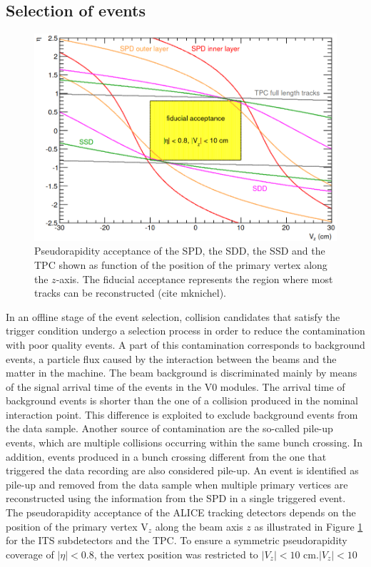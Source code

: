 \documentclass[12pt,a4paper]{report}
\begin{document}
\subsection{Selection of events}
\begin{figure}[tb!]
\centering
\includegraphics[width=12cm]{Plots/fiducialAcc.png}  
\caption{Pseudorapidity acceptance of the SPD, the SDD, the SSD and the TPC shown as function of the position of the primary vertex along the $z$-axis. The fiducial acceptance represents the region where most tracks can be reconstructed (cite mknichel).}
\label{fiducialAcc}
\end{figure}
In an offline stage of the event selection, collision candidates that satisfy the trigger condition undergo a selection process in order to reduce the contamination with poor quality events. A part of this contamination corresponds to background events, a particle flux caused by the interaction between the beams and the matter in the machine. The beam background is discriminated mainly by means of the signal arrival time of the events in the V0 modules. The arrival time of background events is shorter than the one of a collision produced in the nominal interaction point. This difference is exploited to exclude background events from the data sample. Another source of contamination are the so-called pile-up events, which are multiple collisions occurring within the same bunch crossing. In addition, events produced in a bunch crossing different from the one that triggered the data recording are also considered pile-up. An event is identified as pile-up and removed from the data sample when multiple primary vertices are reconstructed using the information from the SPD in a single triggered event.\\
The pseudorapidity acceptance of the ALICE tracking detectors depends on the position of the primary vertex $\text{V}_z$ along the beam axis $z$ as illustrated in Figure \ref{fiducialAcc} for the ITS subdetectors and the TPC. To ensure a symmetric pseudorapidity  coverage of $|\eta| < 0.8$, the vertex position was restricted to $|V_z| < 10$ cm.$|V_z| < 10$ 
\end{document}

